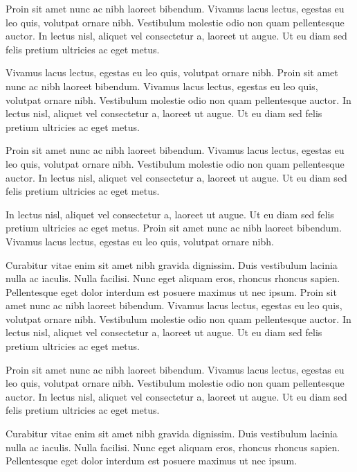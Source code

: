 Proin sit amet nunc ac nibh laoreet bibendum. Vivamus lacus lectus, egestas eu leo quis, volutpat ornare nibh. Vestibulum molestie odio non quam pellentesque auctor. In lectus nisl, aliquet vel consectetur a, laoreet ut augue. Ut eu diam sed felis pretium ultricies ac eget metus.



Vivamus lacus lectus, egestas eu leo quis, volutpat ornare nibh. Proin sit amet nunc ac nibh laoreet bibendum. Vivamus lacus lectus, egestas eu leo quis, volutpat ornare nibh. Vestibulum molestie odio non quam pellentesque auctor. In lectus nisl, aliquet vel consectetur a, laoreet ut augue. Ut eu diam sed felis pretium ultricies ac eget metus.


\begin{corollary}
Proin sit amet nunc ac nibh laoreet bibendum. Vivamus lacus lectus, egestas eu leo quis, volutpat ornare nibh. Vestibulum molestie odio non quam pellentesque auctor. In lectus nisl, aliquet vel consectetur a, laoreet ut augue. Ut eu diam sed felis pretium ultricies ac eget metus.	
\end{corollary}

\begin{corollary}
In lectus nisl, aliquet vel consectetur a, laoreet ut augue. Ut eu diam sed felis pretium ultricies ac eget metus. Proin sit amet nunc ac nibh laoreet bibendum. Vivamus lacus lectus, egestas eu leo quis, volutpat ornare nibh.	
\end{corollary}


Curabitur vitae enim sit amet nibh gravida dignissim. Duis vestibulum lacinia nulla ac iaculis. Nulla facilisi. Nunc eget aliquam eros, rhoncus rhoncus sapien. Pellentesque eget dolor interdum est posuere maximus ut nec ipsum. Proin sit amet nunc ac nibh laoreet bibendum. Vivamus lacus lectus, egestas eu leo quis, volutpat ornare nibh. Vestibulum molestie odio non quam pellentesque auctor. In lectus nisl, aliquet vel consectetur a, laoreet ut augue. Ut eu diam sed felis pretium ultricies ac eget metus.

Proin sit amet nunc ac nibh laoreet bibendum. Vivamus lacus lectus, egestas eu leo quis, volutpat ornare nibh. Vestibulum molestie odio non quam pellentesque auctor. In lectus nisl, aliquet vel consectetur a, laoreet ut augue. Ut eu diam sed felis pretium ultricies ac eget metus.

\begin{lemma}
Curabitur vitae enim sit amet nibh gravida dignissim. Duis vestibulum lacinia nulla ac iaculis. Nulla facilisi. Nunc eget aliquam eros, rhoncus rhoncus sapien. Pellentesque eget dolor interdum est posuere maximus ut nec ipsum.
\end{lemma}

